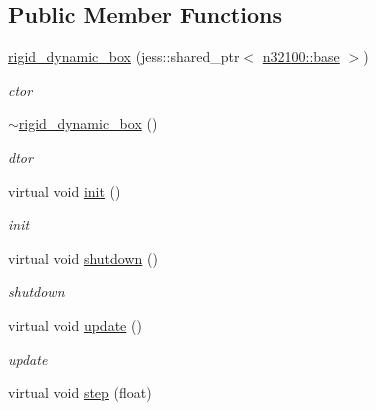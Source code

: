 \subsection*{Public Member Functions}
\begin{DoxyCompactItemize}
\item 
\hyperlink{classnebula_1_1content_1_1actor_1_1admin_1_1rigid__dynamic__box_a8b5e6ab5f15321dd3530d4e91b68d4cf}{rigid\_\-dynamic\_\-box} (jess::shared\_\-ptr$<$ \hyperlink{classnebula_1_1content_1_1scene_1_1admin_1_1base}{n32100::base} $>$)
\begin{DoxyCompactList}\small\item\em ctor \item\end{DoxyCompactList}\item 
\hyperlink{classnebula_1_1content_1_1actor_1_1admin_1_1rigid__dynamic__box_a49deea3c5a05b7b84735aecedb02cdea}{$\sim$rigid\_\-dynamic\_\-box} ()
\begin{DoxyCompactList}\small\item\em dtor \item\end{DoxyCompactList}\item 
virtual void \hyperlink{classnebula_1_1content_1_1actor_1_1admin_1_1rigid__dynamic__box_a3d03f28e3ba455be0f39ad66e00c02c9}{init} ()
\begin{DoxyCompactList}\small\item\em init \item\end{DoxyCompactList}\item 
virtual void \hyperlink{classnebula_1_1content_1_1actor_1_1admin_1_1rigid__dynamic__box_af3ecd05192435e30fbe258f243d18adc}{shutdown} ()
\begin{DoxyCompactList}\small\item\em shutdown \item\end{DoxyCompactList}\item 
virtual void \hyperlink{classnebula_1_1content_1_1actor_1_1admin_1_1rigid__dynamic__box_ad0c1ca664351042f80ede5ed0a5bba0a}{update} ()
\begin{DoxyCompactList}\small\item\em update \item\end{DoxyCompactList}\item 
virtual void \hyperlink{classnebula_1_1content_1_1actor_1_1admin_1_1rigid__dynamic__box_a2989dba143de5dabded9ca32702cccaa}{step} (float)

\end{DoxyCompactItemize}
